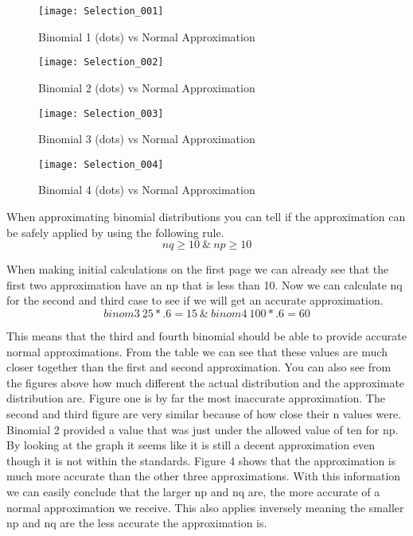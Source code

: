 \documentclass{article}
\begin{document}
\newpage

\begin{figure}[h]
\texttt{[image: Selection\_001]}
\centering
\caption{Binomial 1 (dots) vs Normal Approximation}
\end{figure}

\begin{figure}[h!]
\texttt{[image: Selection\_002]}
\centering
\caption{Binomial 2 (dots) vs Normal Approximation}
\end{figure}

\newpage

\begin{figure}[h]
\texttt{[image: Selection\_003]}
\centering
\caption{Binomial 3 (dots) vs Normal Approximation}
\end{figure}

\begin{figure}[h!]
\texttt{[image: Selection\_004]}
\centering
\caption{Binomial 4 (dots) vs Normal Approximation}
\end{figure}

\newpage
\doublespace
When approximating binomial distributions you can tell if the approximation can be safely applied by using the following rule.
\[nq \geq 10\ \&\ np \geq 10\]

When making initial calculations on the first page we can already see that the first two approximation have an np that is less than 10. Now we can calculate nq for the second and third case to see if we will get an accurate approximation.
\[binom 3\ 25 * .6 = 15\ \& \ binom 4\ 100 * .6 = 60\]

This means that the third and fourth binomial should be able to provide accurate normal approximations.  From the table we can see that these values are much closer together than the first and second approximation.  You can also see from the figures above how much different the actual distribution and the approximate distribution are.  Figure one is by far the most inaccurate approximation.  The second and third figure are very similar because of how close their n values were.  Binomial 2 provided a value that was just under the allowed value of ten for np.  By looking at the graph it seems like it is still a decent approximation even though it is not within the standards.  Figure 4 shows that the approximation is much more accurate than the other three approximations.  With this information we can easily conclude that the larger np and nq are, the more accurate of a normal approximation we receive.  This also applies inversely meaning the smaller np and nq are the less accurate the approximation is.
\end{document}
